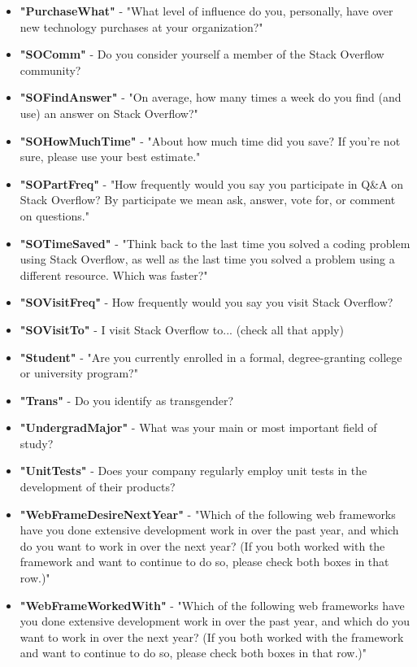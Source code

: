 \begin{appendices}
\begin{itemize}
        \item \textbf{"PurchaseWhat"} - "What level of influence do you, personally, have over new technology purchases at your organization?"
        \item \textbf{"SOComm"} - Do you consider yourself a member of the Stack Overflow community?
        \item \textbf{"SOFindAnswer"} - "On average, how many times a week do you find (and use) an answer on Stack Overflow?"
        \item \textbf{"SOHowMuchTime"} - "About how much time did you save? If you're not sure, please use your best estimate."
        \item \textbf{"SOPartFreq"} - "How frequently would you say you participate in Q&A on Stack Overflow? By participate we mean ask, answer, vote for, or comment on questions."
        \item \textbf{"SOTimeSaved"} - "Think back to the last time you solved a coding problem using Stack Overflow, as well as the last time you solved a problem using a different resource. Which was faster?"
        \item \textbf{"SOVisitFreq"} - How frequently would you say you visit Stack Overflow?
        \item \textbf{"SOVisitTo"} - I visit Stack Overflow to... (check all that apply)
        \item \textbf{"Student"} - "Are you currently enrolled in a formal, degree-granting college or university program?"
        \item \textbf{"Trans"} - Do you identify as transgender?
        \item \textbf{"UndergradMajor"} - What was your main or most important field of study?
        \item \textbf{"UnitTests"} - Does your company regularly employ unit tests in the development of their products?
        \item \textbf{"WebFrameDesireNextYear"} - "Which of the following web frameworks have you done extensive development work in over the past year, and which do you want to work in over the next year? (If you both worked with the framework and want to continue to do so, please check both boxes in that row.)"
        \item \textbf{"WebFrameWorkedWith"} - "Which of the following web frameworks have you done extensive development work in over the past year, and which do you want to work in over the next year? (If you both worked with the framework and want to continue to do so, please check both boxes in that row.)"

\end{itemize}
\end{appendices}
